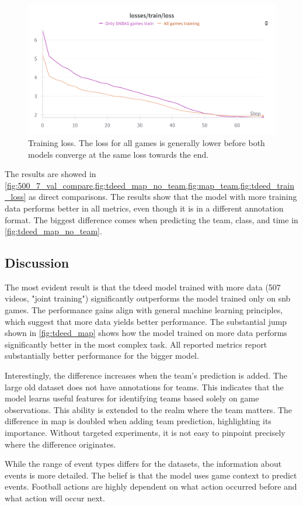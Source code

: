 \begin{figure}
    \centering
    \includegraphics[width=0.5\linewidth]{figures/tdeed_train_loss.png}
    \caption{Training loss. The loss for all games is generally lower before both models converge at the same loss towards the end. }
    \label{fig:tdeed_train_loss}
\end{figure}

The results are showed in \cref{fig:500_7_val_compare,fig:tdeed_map_no_team,fig:map_team,fig:tdeed_train_loss} as direct comparisons. The results show that the model with more training data performs better in all metrics, even though it is in a different annotation format. The biggest difference comes when predicting the team, class, and time in \cref{fig:tdeed_map_no_team}.

\subsection{Discussion}
\label{ssec:ex5_discussion}

The most evident result is that the \acrshort{tdeed} model trained with more data (507 videos, "joint training") significantly outperforms the model trained only on \acrshort{snb} games. The performance gains align with general machine learning principles, which suggest that more data yields better performance. The substantial jump shown in \cref{fig:tdeed_map} shows how the model trained on more data performs significantly better in the most complex task. All reported metrics report substantially better performance for the bigger model. 

Interestingly, the difference increases when the team's prediction is added. The large old dataset does not have annotations for teams. This indicates that the model learns useful features for identifying teams based solely on game observations. This ability is extended to the realm where the team matters. The difference in \acrshort{map} is doubled when adding team prediction, highlighting its importance. Without targeted experiments, it is not easy to pinpoint precisely where the difference originates.  

While the range of event types differs for the datasets, the information about events is more detailed. The belief is that the model uses game context to predict events. Football actions are highly dependent on what action occurred before and what action will occur next. 

